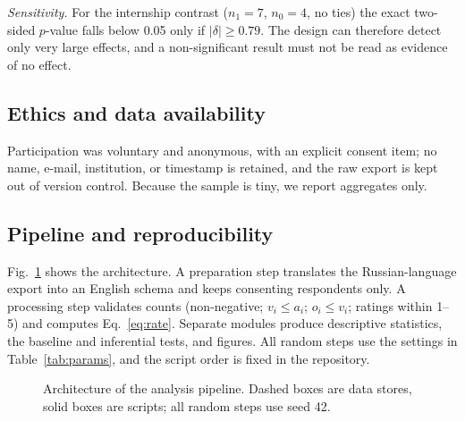 \documentclass[conference]{IEEEtran}
\begin{document}
\textit{Sensitivity.} For the internship contrast ($n_1=7$, $n_0=4$, no ties) the exact two-sided $p$-value falls below 0.05 only if $|\delta|\ge 0.79$. The design can therefore detect only very large effects, and a non-significant result must not be read as evidence of no effect.

\subsection{Ethics and data availability}
Participation was voluntary and anonymous, with an explicit consent item; no name, e-mail, institution, or timestamp is retained, and the raw export is kept out of version control. Because the sample is tiny, we report aggregates only.

\subsection{Pipeline and reproducibility}
\label{sec:pipeline}
Fig.~\ref{fig:arch} shows the architecture. A preparation step translates the Russian-language export into an English schema and keeps consenting respondents only. A processing step validates counts (non-negative; $v_i\le a_i$; $o_i\le v_i$; ratings within 1--5) and computes Eq.~\eqref{eq:rate}. Separate modules produce descriptive statistics, the baseline and inferential tests, and figures. All random steps use the settings in Table~\ref{tab:params}, and the script order is fixed in the repository.

\begin{figure}[t]
\centering
{}
\caption{Architecture of the analysis pipeline. Dashed boxes are data stores, solid boxes are scripts; all random steps use seed 42.}
\label{fig:arch}
\end{figure}
\end{document}
